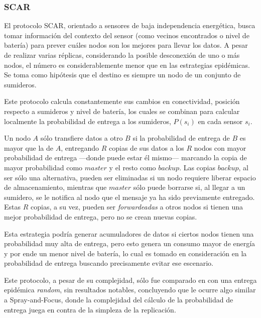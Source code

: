 \subsubsection{SCAR}
El protocolo SCAR\cite{scar}, orientado a sensores de baja independencia energética, busca tomar información del contexto del sensor (como vecinos encontrados o nivel de batería) para prever cuáles nodos son los mejores para llevar los datos. A pesar de realizar varias réplicas, considerando la posible desconexión de uno o más nodos, el número es considerablemente menor que en las estrategias epidémicas. Se toma como hipótesis que el destino es siempre un nodo de un conjunto de sumideros.

Este protocolo calcula constantemente sus cambios en conectividad, posición respecto a sumideros y nivel de batería, los cuales se combinan para calcular localmente la probabilidad de entrega a los sumideros, $P(s_i)$ en cada sensor $s_i$.

Un nodo $A$ sólo transfiere datos a otro $B$ si la probabilidad de entrega de $B$ es mayor que la de $A$, entregando $R$ copias de sus datos a los $R$ nodos con mayor probabilidad de entrega ---donde puede estar él mismo--- marcando la copia de mayor probabilidad como $master$ y el resto como $backup$. Las copias $backup$, al ser sólo una alternativa, pueden ser eliminadas si un nodo requiere liberar espacio de almacenamiento, mientras que $master$ sólo puede borrarse si, al llegar a un sumidero, se le notifica al nodo que el mensaje ya ha sido previamente entregado. Estas $R$ copias, a su vez, pueden ser \emph{forwardeadas} a otros nodos si tienen una mejor probabilidad de entrega, pero no se crean nuevas copias.

Esta estrategia podría generar acumuladores de datos si ciertos nodos tienen una probabilidad muy alta de entrega, pero esto genera un consumo mayor de energía y por ende un menor nivel de batería, lo cual es tomado en consideración en la probabilidad de entrega buscando precisamente evitar ese escenario.

Este protocolo, a pesar de su complejidad, sólo fue comparado en \cite{scar2} con una entrega epidémica \emph{random}, sin resultados notables, concluyendo que le ocurre algo similar a Spray-and-Focus, donde la complejidad del cálculo de la probabilidad de entrega juega en contra de la simpleza de la replicación.